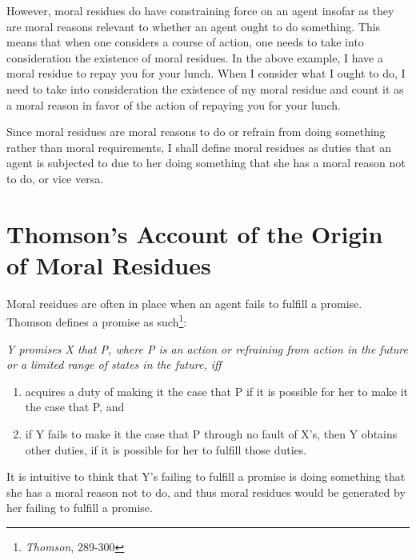 However, moral residues do have constraining force on an agent insofar
as they are moral reasons relevant to whether an agent ought to do
something. This means that when one considers a course of action, one
needs to take into consideration the existence of moral residues. In the
above example, I have a moral residue to repay you for your lunch. When
I consider what I ought to do, I need to take into consideration the
existence of my moral residue and count it as a moral reason in favor of
the action of repaying you for your lunch.

Since moral residues are moral reasons to do or refrain from doing
something rather than moral requirements, I shall define moral residues
as duties that an agent is subjected to due to her doing something that
she has a moral reason not to do, or vice versa.

\section{Thomson's Account of the Origin of Moral Residues}

Moral residues are often in place when an agent fails to fulfill a
promise. Thomson defines a promise as such\footnote{\emph{Thomson},
  289-300}:

\begin{displayquote} \def\labelenumi{(\arabic{enumi})}
\itshape Y promises X that P, where P is an action or refraining from
action in the future or a limited range of states in the future, iff
	\begin{enumerate}
		\item acquires a duty of making it the case that P if it is possible
for her to make it the case that P, and
		\item if Y fails to make it the case that P through no fault of X's,
then Y obtains other duties, if it is possible for her to fulfill those
duties.
	\end{enumerate}
\end{displayquote}	
\noindent It is intuitive to think that Y's failing to fulfill a promise is doing
something that she has a moral reason not to do, and thus moral residues
would be generated by her failing to fulfill a promise.

